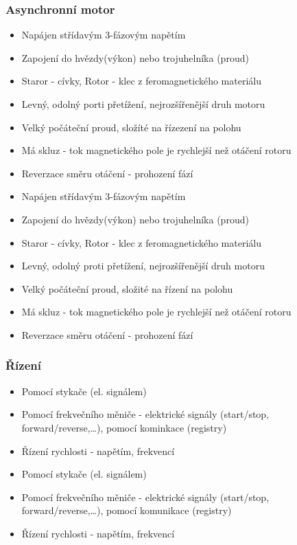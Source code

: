 \subsubsection*{Asynchronní motor}
\begin{itemize}
  \item Napájen střídavým 3-fázovým napětím
  \item Zapojení do hvězdy(výkon) nebo trojuhelníka (proud)
  \item Staror - cívky, Rotor - klec z feromagnetického materiálu
  \item Levný, odolný porti přetížení, nejrozšířenější druh motoru
  \item Velký počáteční proud, složíté na řízezení na polohu
  \item Má skluz - tok magnetického pole je rychlejší než otáčení rotoru
  \item Reverzace směru otáčení - prohození fází
    \item Napájen střídavým 3-fázovým napětím
    \item Zapojení do hvězdy(výkon) nebo trojuhelníka (proud)
    \item Staror - cívky, Rotor - klec z feromagnetického materiálu
    \item Levný, odolný proti přetížení, nejrozšířenější druh motoru
    \item Velký počáteční proud, složité na řízení na polohu
    \item Má skluz - tok magnetického pole je rychlejší než otáčení rotoru
    \item Reverzace směru otáčení - prohození fází
\end{itemize}

\subsubsection*{Řízení}
\begin{itemize}
  \item Pomocí stykače (el. signálem)
  \item Pomocí frekvečního měniče - elektrické signály (start/stop, forward/reverse,\dots), pomocí kominkace (registry)
  \item Řízení rychlosti - napětím, frekvencí
    \item Pomocí stykače (el. signálem)
    \item Pomocí frekvečního měniče - elektrické signály (start/stop, forward/reverse,\dots), pomocí komunikace (registry)
    \item Řízení rychlosti - napětím, frekvencí
\end{itemize}

